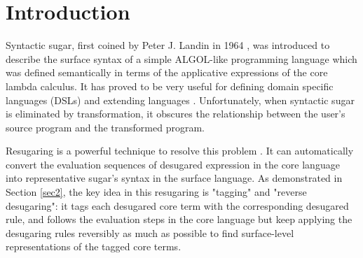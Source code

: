 \section{Introduction}








Syntactic sugar, first coined by Peter J. Landin in 1964 \cite{syntacticsugar}, was introduced to describe the surface syntax of a simple ALGOL-like programming language which was defined semantically in terms of the applicative expressions of the core lambda calculus. It has proved to be very useful for defining domain specific languages (DSLs) and extending languages \cite{FellFFKBMT18,CulpFFK19}.
Unfortunately, when syntactic sugar is eliminated by transformation, it obscures the relationship between the user’s source program and the transformed program.

%

Resugaring is a powerful technique to resolve this problem \cite{resugaring,hygienic}. It  can automatically convert the evaluation sequences of desugared expression in the core language into representative sugar's syntax in the surface language.
As demonstrated in Section \ref{sec2},
the key idea in this resugaring is "tagging" and "reverse desugaring": it tags each desugared core term with the corresponding desugared rule, and follows the evaluation steps in the core language but keep applying the desugaring rules reversibly as much as possible to find surface-level representations of the tagged core terms.

